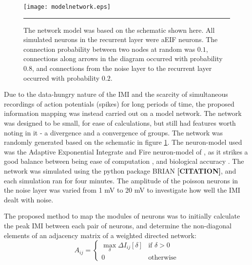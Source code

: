 \begin{figure}[thb]
  \centering
  \texttt{[image: modelnetwork.eps]}
  \rule{35em}{0.5pt}
  \caption{\label{modelnetwork}The network model was based on the schematic shown here.  All simulated neurons in the recurrent layer were aEIF neurons.  The connection probability between two nodes at random was $0.1$, connections along arrows in the diagram occurred with probability $0.8$, and connections from the noise layer to the recurrent layer occurred with probability $0.2$.}
\end{figure}

Due to the data-hungry nature of the IMI and the scarcity of simultaneous recordings of  action potentials (spikes) for long periods of time, the proposed information mapping was instead carried out on a model network.  The network was designed to be small, for ease of calculations, but still had features worth noting in it - a divergence and a convergence of groups.  The network was randomly generated based on the schematic in figure \ref{modelnetwork}.  The neuron-model used was the Adaptive Exponential Integrate and Fire neuron-model of \cite{BretteGerstner2005a}, as it strikes a good balance between being ease of computation \cite{HopfieldHerz1995a}, and biological accuracy \cite{HodgkinHuxley1952a}.  The network was simulated using the python package BRIAN {\bf [CITATION]}, and each simulation ran for four minutes.  The amplitude of the poisson neurons in the noise layer was varied from 1 mV to 20 mV to investigate how well the IMI dealt with noise.

The proposed method to map the modules of neurons was to initially calculate the peak IMI between each pair of neurons, and determine the non-diagonal elements of an adjacency matrix of a weighted directed network:
\begin{equation}\label{adjmat}
A_{ij} = \left\{ \begin{array}{ll} \max_{\delta} \Delta I_{ij}[\delta] & \text{if } \delta>0 \\ 0 & \text{otherwise} \end{array}\right.
\end{equation}

